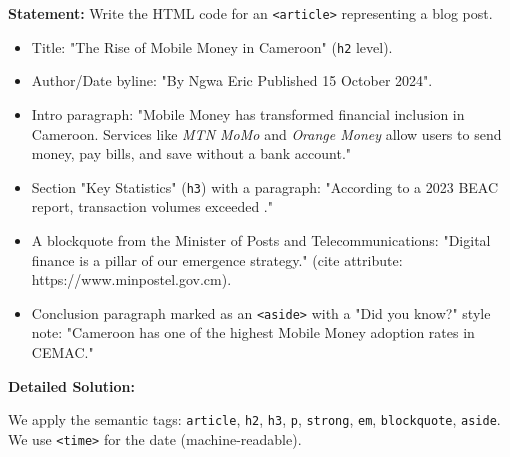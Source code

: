 \documentclass[11pt]{article}
\begin{document}
\begin{exoresolu}
\textbf{Statement:} Write the HTML code for an \texttt{<article>} representing a blog post.
\begin{itemize}
    \item Title: "The Rise of Mobile Money in Cameroon" (\texttt{h2} level).
    \item Author/Date byline: "By Ngwa Eric \textemdash Published 15 October 2024".
    \item Intro paragraph: "Mobile Money has transformed financial inclusion in Cameroon. Services like \emph{MTN MoMo} and \emph{Orange Money} allow users to send money, pay bills, and save without a bank account."
    \item Section "Key Statistics" (\texttt{h3}) with a paragraph: "According to a 2023 BEAC report, transaction volumes exceeded ."
    \item A blockquote from the Minister of Posts and Telecommunications: "Digital finance is a pillar of our emergence strategy." (cite attribute: https://www.minpostel.gov.cm).
    \item Conclusion paragraph marked as an \texttt{<aside>} with a "Did you know?" style note: "Cameroon has one of the highest Mobile Money adoption rates in CEMAC."
\end{itemize}
\tcblower
\textbf{Detailed Solution:}

We apply the semantic tags: \texttt{article}, \texttt{h2}, \texttt{h3}, \texttt{p}, \texttt{strong}, \texttt{em}, \texttt{blockquote}, \texttt{aside}. We use \texttt{<time>} for the date (machine-readable).


\end{exoresolu}
\end{document}
